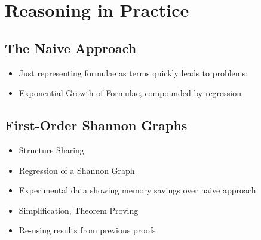 \chapter{Reasoning in Practice}\label{ch:implementation}

\section{The Naive Approach}

\begin{itemize}
\item Just representing formulae as terms quickly leads to problems:
\item Exponential Growth of Formulae, compounded by regression
\end{itemize}

\section{First-Order Shannon Graphs}

\begin{itemize}
\item Structure Sharing
\item Regression of a Shannon Graph
\item Experimental data showing memory savings over naive approach
\item Simplification, Theorem Proving
\item Re-using results from previous proofs
\end{itemize}

